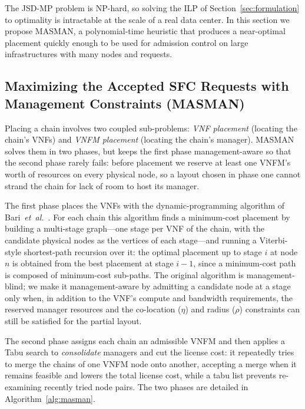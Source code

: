 The JSD-MP problem is NP-hard, so solving the ILP of
Section~\ref{sec:formulation} to optimality is intractable at the scale of a real
data center. In this section we propose MASMAN, a polynomial-time heuristic that
produces a near-optimal placement quickly enough to be used for admission control
on large infrastructures with many nodes and requests.

\subsection{Maximizing the Accepted SFC Requests with Management Constraints (MASMAN)}
Placing a chain involves two coupled sub-problems: \emph{VNF placement} (locating
the chain's VNFs) and \emph{VNFM placement} (locating the chain's manager). MASMAN
solves them in two phases, but keeps the first phase management-aware so that the
second phase rarely fails: before placement we reserve at least one VNFM's worth of
resources on every physical node, so a layout chosen in phase one cannot strand the
chain for lack of room to host its manager.

The first phase places the VNFs with the dynamic-programming algorithm of
Bari~\textit{et~al.}~\cite{Bari2015}. For each chain this algorithm finds a
minimum-cost placement by building a multi-stage graph---one stage per VNF of the
chain, with the candidate physical nodes as the vertices of each stage---and
running a Viterbi-style shortest-path recursion over it: the optimal placement up
to stage \(i\) at node \(n\) is obtained from the best placement at stage
\(i-1\), since a minimum-cost path is composed of minimum-cost sub-paths. The
original algorithm is management-blind; we make it management-aware by admitting a
candidate node at a stage only when, in addition to the VNF's compute and
bandwidth requirements, the reserved manager resources and the co-location
(\(\eta\)) and radius (\(\rho\)) constraints can still be satisfied for the
partial layout.

The second phase assigns each chain an admissible VNFM and then applies a Tabu
search to \emph{consolidate} managers and cut the license cost: it repeatedly
tries to merge the chains of one VNFM node onto another, accepting a merge when it
remains feasible and lowers the total license cost, while a tabu list prevents
re-examining recently tried node pairs. The two phases are detailed in
Algorithm~\ref{alg:masman}.

